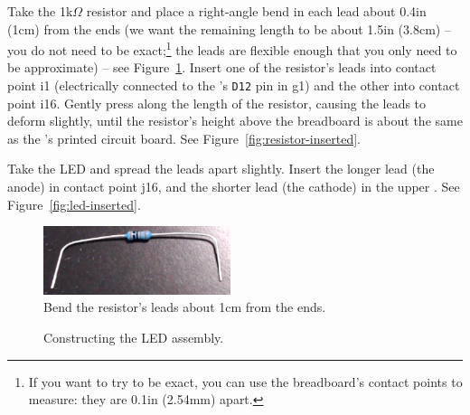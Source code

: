 Take the 1k$\Omega$ resistor and place a right-angle bend in each lead about
0.4in (1cm) from the ends (we want the remaining length to be about 1.5in
(3.8cm) -- you do not need to be exact;\footnote{If you want to try to be
exact, you can use the breadboard's contact points to measure: they are 0.1in
(2.54mm) apart.} the leads are flexible enough that you only need to be
approximate) -- see Figure~\ref{fig:resistor-bent}. Insert one of the resistor's
leads into contact point i1 (electrically connected to the \nano's \texttt{D12}
pin in g1) and the other into contact point i16. Gently press along the length
of the resistor, causing the leads to deform slightly, until the resistor's
height above the breadboard is about the same as the \nano's printed circuit
board. See Figure~\ref{fig:resistor-inserted}.

Take the LED and spread the leads apart slightly. Insert the longer lead (the
anode) in contact point j16, and the shorter lead (the cathode) in the upper
\ground. See Figure~\ref{fig:led-inserted}.

\begin{figure}
    \centering
    \includegraphics[height=2cm]{resistor-bent}
    \caption{Bend the resistor's leads about 1cm from the ends.\label{fig:resistor-bent}}
\end{figure}

\begin{figure}
    \centering
    \hfil
    \caption{Constructing the LED assembly.}
\end{figure}

